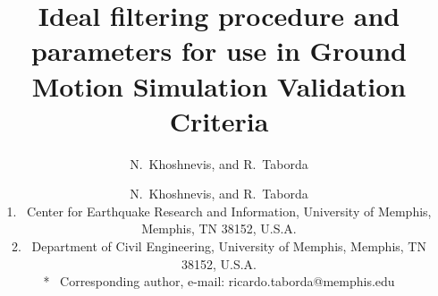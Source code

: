

\posttitle{
    \end{flushleft}
}


\postauthor{
    \end{flushleft}
    \vspace{-30pt}
}


\predate{
    \begin{flushleft}
    \makeatletter
}

\postdate{
    \end{flushleft}
}

\title{%
    Ideal filtering procedure and parameters for use in Ground Motion Simulation Validation Criteria
}

\makeatletter
\if@twocolumn
    \date{}
    \author{N.~Khoshnevis, and R.~Taborda}%
\else
    \author{
    	N.~Khoshnevis, and R.~Taborda\\
    	\normalsize\normalfont    	    	
        \vspace{15pt}
    	1.~
    	Center for Earthquake Research and Information,
        University of Memphis, Memphis, TN 38152, U.S.A.\\
        2.~
    	Department of Civil Engineering,
    	University of Memphis, Memphis, TN 38152, U.S.A.\\
        *~
    	Corresponding author,
    	e-mail: ricardo.taborda@memphis.edu\\
        \vspace{30pt}
    }
\fi
\makeatother

